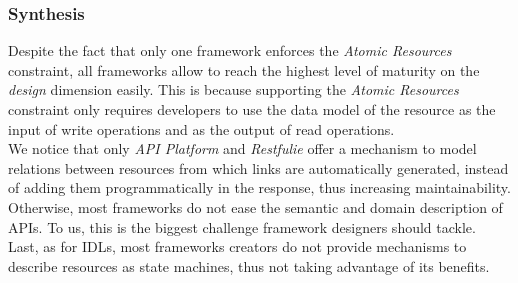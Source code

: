 \subsubsection*{Synthesis}
Despite the fact that only one framework enforces the \textit{Atomic Resources} constraint, all frameworks allow to reach the highest level of maturity on the \textit{design} dimension easily. This is because supporting the \textit{Atomic Resources} constraint only requires developers to use the data model of the resource as the input of write operations and as the output of read operations.\\
We notice that only \textit{API Platform} and \textit{Restfulie} offer a mechanism to model relations between resources from which links are automatically generated, instead of adding them programmatically in the response, thus increasing maintainability.\\
Otherwise, most frameworks do not ease the semantic and domain description of APIs. To us, this is the biggest challenge framework designers should tackle.\\
Last, as for IDLs, most frameworks creators do not provide mechanisms to describe resources as state machines, thus not taking advantage of its benefits.
